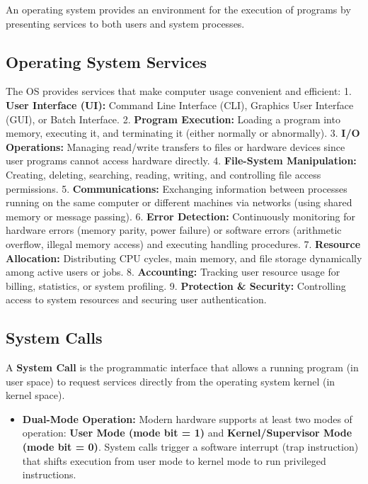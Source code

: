 \documentclass[12pt,a4paper]{article}
\begin{document}
An operating system provides an environment for the execution of programs by presenting services to both users and system processes.

\subsection{Operating System Services}
The OS provides services that make computer usage convenient and efficient:
1. \textbf{User Interface (UI):} Command Line Interface (CLI), Graphics User Interface (GUI), or Batch Interface.
2. \textbf{Program Execution:} Loading a program into memory, executing it, and terminating it (either normally or abnormally).
3. \textbf{I/O Operations:} Managing read/write transfers to files or hardware devices since user programs cannot access hardware directly.
4. \textbf{File-System Manipulation:} Creating, deleting, searching, reading, writing, and controlling file access permissions.
5. \textbf{Communications:} Exchanging information between processes running on the same computer or different machines via networks (using shared memory or message passing).
6. \textbf{Error Detection:} Continuously monitoring for hardware errors (memory parity, power failure) or software errors (arithmetic overflow, illegal memory access) and executing handling procedures.
7. \textbf{Resource Allocation:} Distributing CPU cycles, main memory, and file storage dynamically among active users or jobs.
8. \textbf{Accounting:} Tracking user resource usage for billing, statistics, or system profiling.
9. \textbf{Protection \& Security:} Controlling access to system resources and securing user authentication.

\subsection{System Calls}

\begin{tcolorbox}[defbox, title={\textbf{Definition: System Call}}]
A \textbf{System Call} is the programmatic interface that allows a running program (in user space) to request services directly from the operating system kernel (in kernel space).
\end{tcolorbox}

\begin{itemize}[leftmargin=*, itemsep=3pt]
  \item \textbf{Dual-Mode Operation:} Modern hardware supports at least two modes of operation: \textbf{User Mode (mode bit = 1)} and \textbf{Kernel/Supervisor Mode (mode bit = 0)}. System calls trigger a software interrupt (trap instruction) that shifts execution from user mode to kernel mode to run privileged instructions.
\end{itemize}
\end{document}
